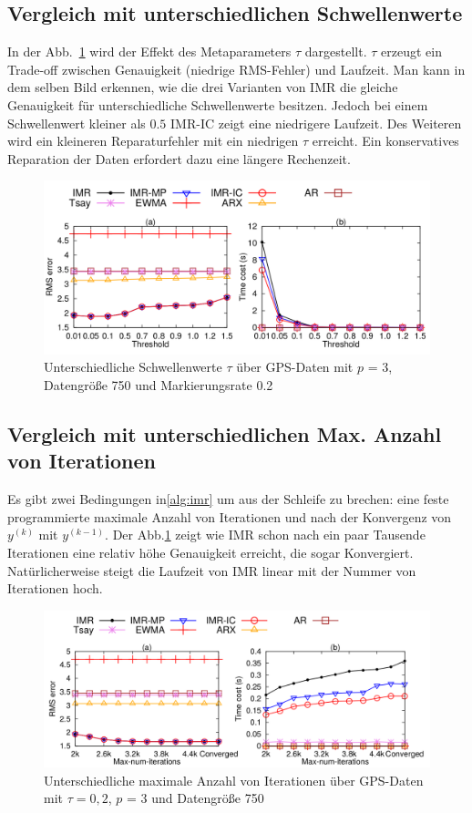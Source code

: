 \subsection{Vergleich mit unterschiedlichen Schwellenwerte}
In der Abb.~\ref{varying_threshold} wird der Effekt des Metaparameters $\tau$
dargestellt. $\tau$ erzeugt ein Trade-off zwischen Genauigkeit (niedrige
RMS-Fehler) und Laufzeit. Man kann in dem selben Bild erkennen, wie die drei
Varianten von IMR die gleiche Genauigkeit für unterschiedliche Schwellenwerte
besitzen. Jedoch bei einem Schwellenwert kleiner als $0.5$ IMR-IC zeigt eine
niedrigere Laufzeit.  Des Weiteren wird ein kleineren Reparaturfehler mit ein
niedrigen $\tau$ erreicht. Ein konservatives Reparation der Daten erfordert
dazu eine längere Rechenzeit. 
\begin{figure}[htbp]
    \centering
    \includegraphics[width=\textwidth]{../plots/varying_threshold.png}
    \caption{Unterschiedliche Schwellenwerte $\tau$ über GPS-Daten mit $p$ = 3, Datengröße 750 und Markierungsrate 0.2}%
    \label{varying_threshold}
\end{figure}
\subsection{Vergleich mit unterschiedlichen Max. Anzahl von Iterationen}
Es gibt zwei Bedingungen in\ref{alg:imr} um aus der Schleife zu brechen: eine
feste programmierte maximale Anzahl von Iterationen und nach der Konvergenz von
$y^{(k)}$ mit $y^{(k-1)}$. Der Abb.\ref{varying_threshold} zeigt wie IMR schon
nach ein paar Tausende Iterationen eine relativ höhe Genauigkeit erreicht, die
sogar Konvergiert. Natürlicherweise steigt die Laufzeit von IMR linear mit der
Nummer von Iterationen hoch.
\begin{figure}[htbp]
    \centering
    \includegraphics[width=\textwidth]{../plots/varying_maximum_number.png}
    \caption{Unterschiedliche maximale Anzahl von Iterationen über GPS-Daten mit $\tau = 0,2$, $p$ = 3 und Datengröße 750}%
    \label{varying_maximum_number}
\end{figure}
